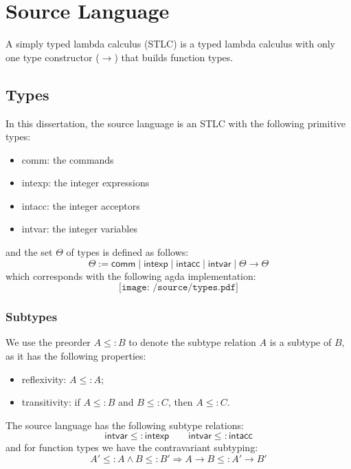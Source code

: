 \documentclass[12pt,twoside,a4paper]{report}
\theoremstyle{definition}
\theoremstyle{definition}
\theoremstyle{definition}
\theoremstyle{definition}
\begin{document}
    \section{Source Language}
    A simply typed lambda calculus (STLC) is a typed lambda calculus with only one type constructor ($\to$) that builds function types. 
    
        \subsection{Types}
        In this dissertation, the source language is an STLC with the following primitive types:
        \begin{itemize}
            \item 
                \textsf{comm}: the commands
            \item 
                \textsf{intexp}: the integer expressions
            \item 
                \textsf{intacc}: the integer acceptors
            \item 
                \textsf{intvar}: the integer variables
        \end{itemize}
        and the set $\Theta$ of types is defined as follows:
        \[ \Theta := \textsf{comm} \mid \textsf{intexp} \mid \textsf{intacc} \mid \textsf{intvar} \mid \Theta \to \Theta \]
        which corresponds with the following agda implementation:
        \[\texttt{[image: /source/types.pdf]}\]

        \subsubsection{Subtypes}
        We use the preorder $A \leq: B$ to denote the subtype relation $A$ is a subtype of $B$, as it has the following properties:
        \begin{itemize}
            \item 
                reflexivity: $A \leq: A$;
            \item 
                transitivity: if $A \leq: B$ and $B \leq: C$, then $A \leq: C$.
        \end{itemize}

        The source language has the following subtype relations:
        \[ \textsf{intvar} \leq: \textsf{intexp} \qquad \textsf{intvar} \leq: \textsf{intacc} \]
        and for function types we have the contravariant subtyping:
        \[ A' \leq: A \land B \leq: B' \Rightarrow A \to B \leq: A' \to B' \]
        
\end{document}
